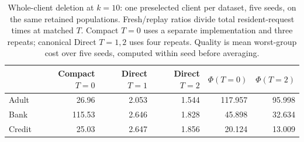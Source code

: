 \begin{table}[htbp]
\centering
\caption{Whole-client deletion at $k=10$: one preselected client per dataset, five seeds, on the same retained populations. Fresh/replay ratios divide total resident-request times at matched $T$. Compact $T=0$ uses a separate implementation and three repeats; canonical Direct $T=1,2$ uses four repeats. Quality is mean worst-group cost over five seeds, computed within seed before averaging.}
\label{tab:client-main}
\begin{tabular}{lrrrrr}
\toprule
 & Compact $T=0$ & Direct $T=1$ & Direct $T=2$ & $\Phi(T=0)$ & $\Phi(T=2)$ \\
\midrule
Adult & 26.96 & 2.053 & 1.544 & 117.957 & 95.998 \\
Bank & 115.53 & 2.646 & 1.828 & 45.898 & 32.634 \\
Credit & 25.03 & 2.647 & 1.856 & 20.124 & 13.009 \\
\bottomrule
\end{tabular}
\end{table}
